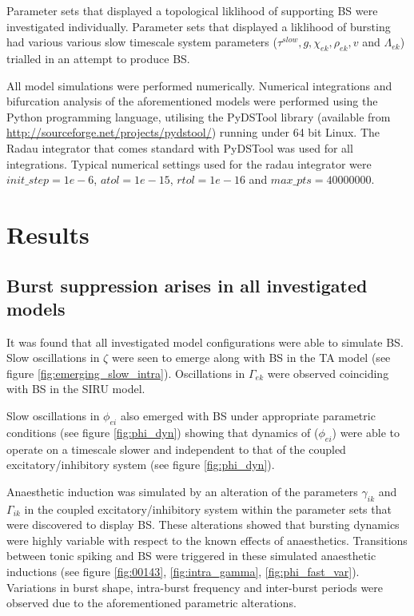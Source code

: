 \documentclass[a4paper,12pt]{article}
\begin{document}
Parameter sets that displayed a topological liklihood of supporting BS were investigated individually. Parameter sets that displayed a liklihood of bursting had various various slow timescale system parameters ($\tau^{slow}, g, \chi_{ek}, \rho_{ek}, v$ and $\Lambda_{ek}$) trialled in an attempt to produce BS. 

All model simulations were performed numerically. Numerical integrations and bifurcation analysis of the aforementioned models were performed using the Python programming language, utilising
the PyDSTool library (available from \url{http://sourceforge.net/projects/pydstool/}) running under 64 bit
Linux. The Radau integrator that comes standard with PyDSTool was used for all integrations.
Typical numerical settings used for the radau integrator were $init\_step = 1e-6$, $atol = 1e-15$, $rtol = 1e-16$ and
$max\_pts = 40000000$.

\section{Results}

\subsection{Burst suppression arises in all investigated models}
It was found that all investigated model configurations were able to simulate BS. Slow oscillations in $\zeta$ were seen to emerge along with BS in the TA model (see figure \ref{fig:emerging_slow_intra}). Oscillations in $\Gamma_{ek}$ were observed coinciding with BS in the SIRU model. 

Slow oscillations in $\phi_{ei}$ also emerged with BS under appropriate parametric conditions (see figure \ref{fig:phi_dyn}) showing that dynamics of ($\phi_{ei}$) were able to operate on a timescale slower and independent to that of the coupled  excitatory/inhibitory system (see figure \ref{fig:phi_dyn}).

Anaesthetic induction was simulated by an alteration of the parameters $\gamma_{ik}$ and $\Gamma_{ik}$ in the coupled excitatory/inhibitory system within the parameter sets that were discovered to display BS.  These alterations showed that bursting dynamics were highly variable with respect to the known effects of anaesthetics. Transitions between tonic spiking and BS were triggered in these simulated anaesthetic inductions (see figure \ref{fig:00143}, \ref{fig:intra_gamma}, \ref{fig:phi_fast_var}). Variations in burst shape, intra-burst frequency and inter-burst periods were observed due to the aforementioned parametric alterations. 
\end{document}

